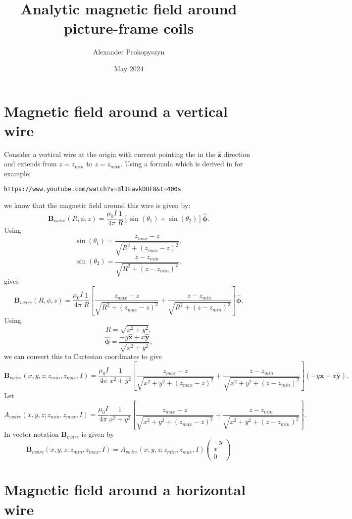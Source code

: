 \documentclass{article}
\title{Analytic magnetic field around picture-frame coils}
\author{Alexander Prokopyszyn}
\date{May 2024}
\begin{document}
\maketitle

\section{Magnetic field around a vertical wire}

Consider a vertical wire at the origin with current pointing the in the $\mathbf{\hat{z}}$ direction and extends from $z=z_{min}$ to $z=z_{max}$. Using a formula which is derived in for example:
\begin{verbatim}
https://www.youtube.com/watch?v=BlIEavkDUF8&t=400s
\end{verbatim}
we know that the magnetic field around this wire is given by:
\[\mathbf{B}_{vwire}(R, \phi, z) = \frac{\mu_0I}{4\pi}\frac{1}{R} \left[\sin(\theta_1) + \sin(\theta_2)\right]\mathbf{\hat{\phi}}.\]
Using
\[\sin(\theta_1) = \frac{z_{max}-z}{\sqrt{R^2+(z_{max}-z)^2}},\]
\[\sin(\theta_2) = \frac{z-z_{min}}{\sqrt{R^2+(z-z_{min})^2}},\]
gives
\[\mathbf{B}_{vwire}(R, \phi, z) = \frac{\mu_0I}{4\pi}\frac{1}{R} \left[\frac{z_{max}-z}{\sqrt{R^2+(z_{max}-z)^2}} + \frac{z-z_{min}}{\sqrt{R^2+(z-z_{min})^2}}\right]\mathbf{\hat{\phi}}.\]
Using
\[R = \sqrt{x^2+y^2},\]
\[\mathbf{\hat{\phi}}=\frac{-y\mathbf{\hat{x}}+x\mathbf{\hat{y}}}{\sqrt{x^2+y^2}},\]
we can convert this to Cartesian coordinates to give
\[\mathbf{B}_{vwire}(x, y, z; z_{min}, z_{max}, I) = \frac{\mu_0I}{4\pi}\frac{1}{x^2+y^2} \left[\frac{z_{max}-z}{\sqrt{x^2+y^2+(z_{max}-z)^2}} + \frac{z-z_{min}}{\sqrt{x^2+y^2+(z-z_{min})^2}}\right](-y\mathbf{\hat{x}}+x\mathbf{\hat{y}}).\]
Let
\[A_{vwire}(x, y, z; z_{min}, z_{max}, I) = \frac{\mu_0I}{4\pi}\frac{1}{x^2+y^2}
\left[\frac{z_{max}-z}{\sqrt{x^2+y^2+(z_{max}-z)^2}} + \frac{z-z_{min}}{\sqrt{x^2+y^2+(z-z_{min})^2}}\right].\]
In vector notation $\mathbf{B}_{vwire}$ is given by
\[\boxed{\mathbf{B}_{vwire}(x, y, z; z_{min}, z_{max}, I) = A_{vwire}(x, y, z; z_{min}, z_{max}, I)
\begin{pmatrix}
    -y \\ x \\ 0
\end{pmatrix}}\]

\section{Magnetic field around a horizontal wire}
\end{document}
